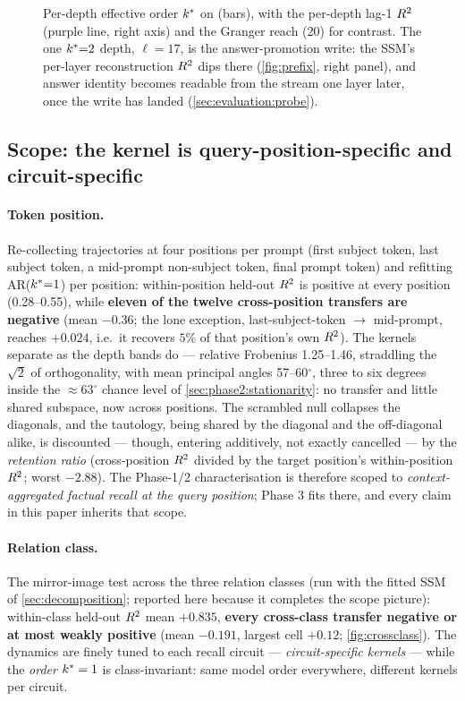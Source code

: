 \begin{figure}[t]
  \centering
  
  \caption{Per-depth effective order $k^{\ast}$ on \pythia{} (bars), with the
  per-depth lag-1 $R^2$ (purple line, right axis) and the Granger reach (20)
  for contrast. The
  one $k^{\ast}{=}2$ depth, $\ell{=}17$, is the answer-promotion write: the SSM's
  per-layer reconstruction $R^2$ dips there (\cref{fig:prefix}, right panel),
  and answer identity becomes readable from the stream one layer later, once
  the write has landed (\cref{sec:evaluation:probe}).}
  \label{fig:kstar}
\end{figure}

\subsection{Scope: the kernel is query-position-specific and circuit-specific}
\label{sec:phase2:scope}

\paragraph{Token position.}
Re-collecting trajectories at four positions per prompt (first subject token,
last subject token, a mid-prompt non-subject token, final prompt token) and
refitting AR($k^{\ast}{=}1$) per position: within-position held-out $R^2$ is
positive at every position (0.28--0.55), while \textbf{eleven of the twelve
cross-position transfers are negative} (mean $-0.36$; the lone exception,
last-subject-token $\to$ mid-prompt, reaches $+0.024$, i.e.\ it recovers
$5\%$ of that position's own $R^2$). The kernels separate as the depth
bands do --- relative Frobenius 1.25--1.46, straddling the $\sqrt2$ of
orthogonality, with mean principal angles 57--60$^\circ$, three to six degrees
inside the ${\approx}63^\circ$ chance level of
\cref{sec:phase2:stationarity}: no transfer and little shared subspace, now
across positions. The scrambled
null collapses the diagonals, and the tautology, being shared by the diagonal
and the off-diagonal alike, is discounted --- though, entering additively,
not exactly cancelled --- by the \emph{retention ratio}
(cross-position $R^2$ divided by the target position's within-position
$R^2$; worst $-2.88$). The Phase-1/2 characterisation is therefore scoped to
\emph{context-aggregated factual recall at the query position}; Phase 3 fits
there, and every claim in this paper inherits that scope.

\paragraph{Relation class.}
The mirror-image test across the three relation classes (run with the fitted
SSM of \cref{sec:decomposition}; reported here because it completes the
scope picture): within-class held-out $R^2$ mean $+0.835$, \textbf{every
cross-class transfer negative or at most weakly positive} (mean $-0.191$,
largest cell $+0.12$;
\cref{fig:crossclass}). The dynamics are finely tuned to each recall circuit
--- \emph{circuit-specific kernels} --- while the \emph{order} $k^{\ast}=1$ is
class-invariant: same model order everywhere, different kernels per circuit.

